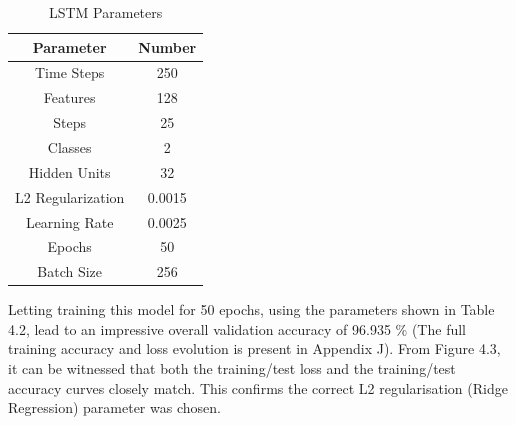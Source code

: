 

{
\begin{table}[h!]
\centering
\begin{tabular}{|c|c|}
\hline
Parameter &Number \\
\hline
Time Steps & 250  \\
Features & 128  \\
Steps & 25  \\
Classes & 2 \\
Hidden Units & 32 \\
L2 Regularization & 0.0015 \\
Learning Rate & 0.0025 \\
Epochs & 50 \\
Batch Size & 256 \\
\hline
\end{tabular}
\caption{LSTM Parameters}
\label{table:1}
\end{table}
}


Letting training this model for 50 epochs, using the parameters shown in Table 4.2, lead to an impressive overall validation accuracy of 96.935 \% (The full training accuracy and loss evolution is present in Appendix J). From Figure 4.3, it can be witnessed that both the training/test loss and the training/test accuracy curves closely match. This confirms the correct L2 regularisation (Ridge Regression) parameter was chosen. 

